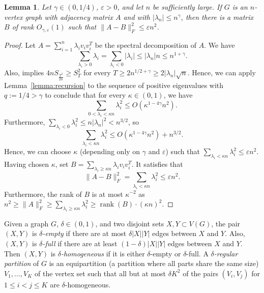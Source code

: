 \documentclass[11pt]{article}
\theoremstyle{plain}
\newtheorem{lemma}[theorem]{Lemma}
\theoremstyle{definition}
\DeclareMathOperator{\rank}{rank}
\newcommand{\eps}{\varepsilon}
\begin{document}
\begin{lemma}\label{lemma:dens2_finding_low_rank_approximation}
Let $\gamma\in (0, 1/4)$, $\eps>0$, and let $n$ be sufficiently large. If $G$ is an $n$-vertex graph with adjacency matrix $A$ and with $|\lambda_n|\leq n^{\gamma}$, then there is a matrix $B$ of rank $O_{\gamma,\eps}(1)$ such that $\|A-B\|_F^2 \leq \eps n^2$.
\end{lemma}
\begin{proof}  
    Let $A=\sum_{i=1}^n \lambda_i v_iv_i^T$ be the spectral decomposition of $A$.
    We have 
    $$\sum_{\lambda_i>0}\lambda_i=\sum_{\lambda_i<0}|\lambda_i|\leq |\lambda_n|n\leq n^{1+\gamma}.$$
    Also,  implies $4nS_{\frac{T^2}{2n}}\geq S_T^2$ for every $T\geq 2n^{1/2+\gamma}\geq 2|\lambda_n|\sqrt{n}$. Hence, we can apply Lemma~\ref{lemma:recursion} to the sequence of positive eigenvalues with $q:=1/4>\gamma$ to conclude that for every $\kappa \in (0,1)$, we have
    $$\sum_{0<\lambda_i<\kappa n}\lambda_i^2\leq O(\kappa^{1-4\gamma}n^{2}).$$
    Furthermore, $\sum_{\lambda_i<0}\lambda_i^2\leq n|\lambda_n|^2<n^{3/2}$, so 
    $$\sum_{\lambda_i<\kappa n}\lambda_i^2\leq O(\kappa^{1-4\gamma}n^{2})+n^{3/2}.$$
    Hence, we can choose $\kappa$ (depending only on $\gamma$ and $\eps$) such that $\sum_{\lambda_i<\kappa n}\lambda_i^2\leq \eps n^2.$ Having chosen $\kappa$, set $B=\sum_{\lambda_i\geq \kappa n}\lambda_i v_iv_i^T$. 
    It satisfies that
    $$\|A-B\|_{F}^2=\sum_{\lambda_i<\kappa n}\lambda_i^2\leq \eps n^2.$$
    Furthermore, the rank of $B$ is at most $\kappa^{-2}$ as $n^2 \ge \|A\|_F^2 \ge \sum_{\lambda_i \ge \kappa n} \lambda_i^2 \ge \rank(B)\cdot (\kappa n)^2$.
\end{proof}

Given a graph $G$, $\delta\in (0,1)$, and two disjoint sets $X,Y\subset V(G)$, the pair $(X,Y)$ is \emph{$\delta$-empty} if there are at most $\delta |X||Y|$ edges between $X$ and $Y$. Also, $(X,Y)$ is \emph{$\delta$-full} if there are at least $(1-\delta) |X||Y|$ edges between $X$ and $Y$. Then $(X,Y)$ is \emph{$\delta$-homogeneous} if it is either $\delta$-empty or $\delta$-full. 
A \emph{$\delta$-regular partition} of $G$ is an equipartition (a partition where all parts share the same size) $V_1,\dots,V_K$ of the vertex set such that  all but at most $\delta K^2$ of the pairs $(V_i,V_j)$ for $1\leq i<j\leq K$ are $\delta$-homogeneous. 
\end{document}
